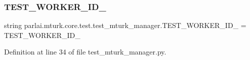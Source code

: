 \subsubsection{\texorpdfstring{T\+E\+S\+T\+\_\+\+W\+O\+R\+K\+E\+R\+\_\+\+I\+D\+\_}{TEST\_WORKER\_ID\_3}}
{\footnotesize\ttfamily string parlai.\+mturk.\+core.\+test.\+test\+\_\+mturk\+\_\+manager.\+T\+E\+S\+T\+\_\+\+W\+O\+R\+K\+E\+R\+\_\+\+I\+D\+\_ = \textquotesingle{}T\+E\+S\+T\+\_\+\+W\+O\+R\+K\+E\+R\+\_\+\+I\+D\+\_\textquotesingle{}}



Definition at line 34 of file test\+\_\+mturk\+\_\+manager.\+py.

